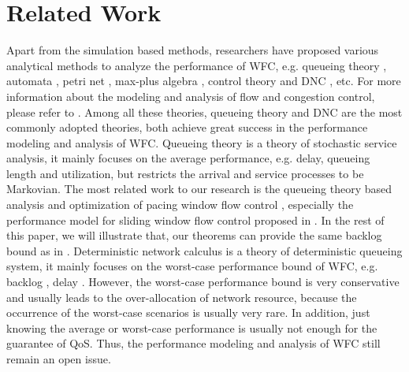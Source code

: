 \documentclass[paper]{ieice}
\begin{document}
\section{Related Work}\label{relate}
Apart from the simulation based methods, researchers have proposed various analytical methods to analyze the performance of WFC, e.g. queueing theory \cite{1094531,Chu:1981:ATQ:1310158.1310656,berger1992impact,jung1996analysis,1095377,1092752,113869}, automata \cite{Billington:2007:FTD:1366708.1366712}, petri net \cite{Gaeta2003}, max-plus algebra \cite{BaHo00}, control theory \cite{wang2008internet} and DNC \cite{CrOk96,AgRa96,Chan98,ACOR99,QLDD09FC,bose2006analysis,Qian2010Analysis}, etc. For more information about the modeling and analysis of flow and congestion control, please refer to \cite{srikant2004mathematics}. Among all these theories, queueing theory and DNC are the most commonly adopted theories, both achieve great success in the performance modeling and analysis of WFC. Queueing theory is a theory of stochastic service analysis, it mainly focuses on the average performance, e.g. delay, queueing length and utilization, but restricts the arrival and service processes to be Markovian. The most related work to our research is the queueing theory based analysis and optimization of pacing window flow control \cite{jung1996analysis,1095377}, especially the performance model for sliding window flow control proposed in \cite{jung1996analysis}. In the rest of this paper, we will illustrate that, our theorems can provide the same backlog bound as in \cite{jung1996analysis}. Deterministic network calculus is a theory of deterministic queueing system, it mainly focuses on the worst-case performance bound of WFC, e.g. backlog \cite{QLDD09FC,bose2006analysis}, delay \cite{Qian2010Analysis}. However, the worst-case performance bound is very conservative and usually leads to the over-allocation of network resource, because the occurrence of the worst-case scenarios is usually very rare. In addition, just knowing the average or worst-case performance is usually not enough for the guarantee of QoS. Thus, the performance modeling and analysis of WFC still remain an open issue.
\end{document}
